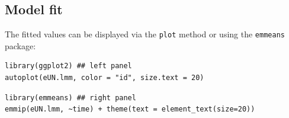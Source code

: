 \documentclass[12pt]{article}
\begin{document}
\subsection{Model fit}
\label{sec:org8ed6341}

The fitted values can be displayed via the \texttt{plot} method or using the \texttt{emmeans} package:

\lstset{language=r,label= ,caption= ,captionpos=b,numbers=none}
\begin{lstlisting}
library(ggplot2) ## left panel
autoplot(eUN.lmm, color = "id", size.text = 20)
\end{lstlisting}

\lstset{language=r,label= ,caption= ,captionpos=b,numbers=none}
\begin{lstlisting}
library(emmeans) ## right panel
emmip(eUN.lmm, ~time) + theme(text = element_text(size=20))
\end{lstlisting}
\end{document}
